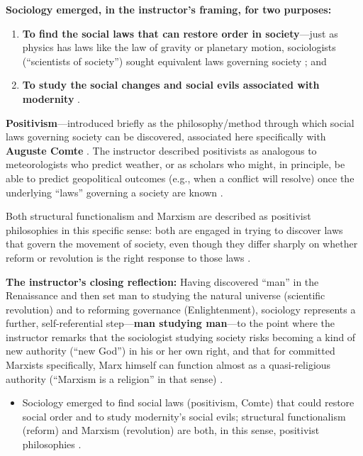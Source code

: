 \begin{CriticalPoint}
\textbf{Sociology emerged, in the instructor's framing, for two purposes:}
\begin{enumerate}
    \item \textbf{To find the social laws that can restore order in society}---just as physics has laws like the law of gravity or planetary motion, sociologists (``scientists of society'') sought equivalent laws governing society ; and
    \item \textbf{To study the social changes and social evils associated with modernity} .
\end{enumerate}

\textbf{Positivism}---introduced briefly as the philosophy/method through which social laws governing society can be discovered, associated here specifically with \textbf{Auguste Comte} . The instructor described positivists as analogous to meteorologists who predict weather, or as scholars who might, in principle, be able to predict geopolitical outcomes (e.g., when a conflict will resolve) once the underlying ``laws'' governing a society are known .

Both structural functionalism and Marxism are described as positivist philosophies in this specific sense: both are engaged in trying to discover laws that govern the movement of society, even though they differ sharply on whether reform or revolution is the right response to those laws .
\end{CriticalPoint}

\begin{CriticalPoint}
\textbf{The instructor's closing reflection:} Having discovered ``man'' in the Renaissance and then set man to studying the natural universe (scientific revolution) and to reforming governance (Enlightenment), sociology represents a further, self-referential step---\textbf{man studying man}---to the point where the instructor remarks that the sociologist studying society risks becoming a kind of new authority (``new God'') in his or her own right, and that for committed Marxists specifically, Marx himself can function almost as a quasi-religious authority (``Marxism is a religion'' in that sense) .
\end{CriticalPoint}

\begin{QuickRevision}
\begin{itemize}
    \item Sociology emerged to find social laws (positivism, Comte) that could restore social order and to study modernity's social evils; structural functionalism (reform) and Marxism (revolution) are both, in this sense, positivist philosophies .
\end{itemize}
\end{QuickRevision}

